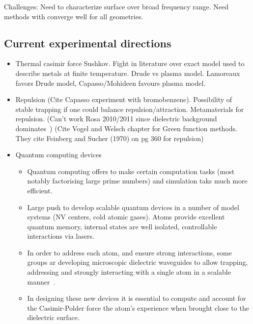 Challenges:  Need to characterize surface over broad frequency range.
Need methods with converge well for all geometries.  

\subsection{Current experimental directions}
\begin{itemize}
\item Thermal casimir force
Sushkov\cite{Sushkov2011}.
Fight in literature over exact model used to describe metals at finite temperature.
Drude vs plasma model.  
 Lamoreaux favors Drude model, Capasso/Mohideen favours plasma model.
\item Repulsion (Cite Capasso experiment with bromobenzene).  Possibility of stable trapping
  if one could balance repulsion/attraction.  
 Metamaterials for repulsion.  (Can't work Rosa 2010/2011 since dielectric
  background dominates~\cite{Rosa2008})
  (Cite Vogel and Welsch chapter for Green function methods.  They cite 
  Feinberg and Sucher (1970) on pg 360 for repulsion)
\item Quantum computing devices
    \begin{itemize}
      \item Quantum computing offers to make certain computation tasks (most notably factorising 
        large prime numbers) and simulation taks much more efficient.  
      \item Large push to develop scalable quantum devices in a number of model systems
        (NV centers, cold atomic gases).  Atoms provide excellent quantum memory, internal
        states are well isolated, controllable interactions via lasers.  
      \item In order to address each atom, and ensure strong interactions, some groups 
        ar developing microscopic dielectric waveguides to allow trapping, addressing and strongly interacting with a 
        single atom in a scalable manner~\cite{Hung2013}.  
      \item In designing these new devices it is essential to compute and account for the Casimir-Polder force
        the atom's experience when brought close to the dielectric surface.  
    \end{itemize}
    



\end{itemize}
